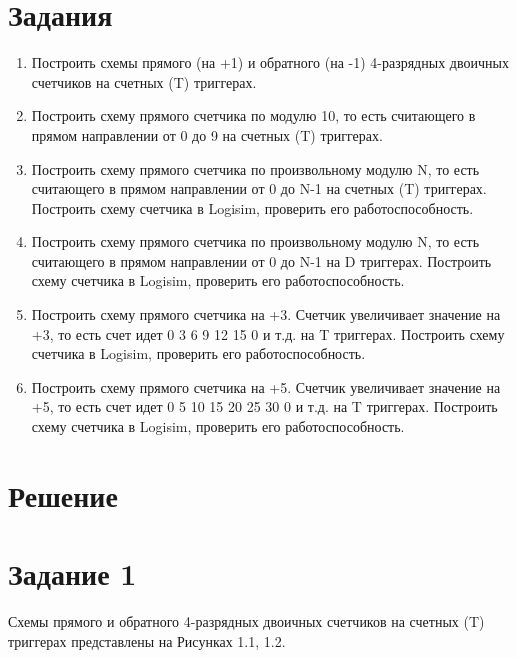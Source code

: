 \documentclass[oneside,a4paper,14pt]{extarticle}
\begin{document}
\section*{Задания}
\begin{enumerate}
	\item
	      Построить схемы прямого (на +1) и обратного (на -1) 4-разрядных
	      двоичных счетчиков на счетных (T) триггерах.
	\item
	      Построить схему прямого счетчика по модулю 10, то есть считающего
	      в прямом направлении от 0 до 9 на счетных (T) триггерах.
	\item
	      Построить схему прямого счетчика по произвольному модулю N, то
	      есть считающего в прямом направлении от 0 до N-1 на счетных (T) триггерах.
	      Построить схему счетчика в Logisim, проверить его работоспособность.
	\item
	      Построить схему прямого счетчика по произвольному модулю N, то
	      есть считающего в прямом направлении от 0 до N-1 на D триггерах.
	      Построить схему счетчика в Logisim, проверить его работоспособность.
	\item 
		  Построить схему прямого счетчика на +3. Счетчик увеличивает значение на
		  +3, то есть счет идет 0 3 6 9 12 15 0 и т.д. на T триггерах. Построить схему
		  счетчика в Logisim, проверить его работоспособность.
	\item 
		  Построить схему прямого счетчика на +5. Счетчик увеличивает значение на
		  +5, то есть счет идет 0 5 10 15 20 25 30 0 и т.д. на T триггерах. Построить
		  схему счетчика в Logisim, проверить его работоспособность.
\end{enumerate}
\newpage

\section*{Решение}

\section*{Задание 1}
Схемы прямого и обратного 4-разрядных двоичных счетчиков на счетных (T) триггерах представлены на Рисунках 1.1, 1.2.\\
\end{document}
